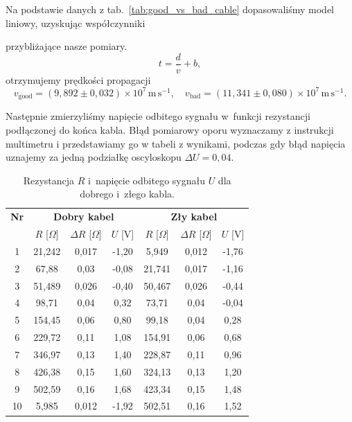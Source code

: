 \documentclass[12pt]{article}
\begin{document}
Na podstawie danych z tab.~\ref{tab:good_vs_bad_cable} dopasowaliśmy model liniowy, uzyskując współczynniki

przybliżające nasze pomiary. 
\[
  t = \frac{d}{v} + b,
\]
otrzymujemy prędkości propagacji
\[
  v_{\mathrm{good}}=(9{,}892\pm0{,}032)\times10^{7}\,\mathrm{m\,s^{-1}},\quad
  v_{\mathrm{bad}}=(11{,}341\pm0{,}080)\times10^{7}\,\mathrm{m\,s^{-1}}.
\]

Następnie zmierzyliśmy napięcie odbitego sygnału w~funkcji rezystancji podłączonej do końca kabla.
Błąd pomiarowy oporu wyznaczamy z instrukcji multimetru\cite{resistance} i przedstawiamy go w tabeli z wynikami, podczas gdy błąd napięcia uznajemy za jedną podziałkę oscyloskopu $\Delta U = 0{,}04$.

\begin{table}[H]
  \centering
    \begin{tabular}{c|ccc|ccc}
        \toprule
        \textbf{Nr} &
        \multicolumn{3}{c|}{\textbf{Dobry kabel}} &
        \multicolumn{3}{c}{\textbf{Zły kabel}} \\
        & $R$ [$\Omega$] & $\Delta R$ [$\Omega$] & $U$ [V] & $R$ [$\Omega$] & $\Delta R$ [$\Omega$] & $U$ [V] \\
        \midrule
        1  & 21{,}242  & 0{,}017 & -1{,}20 & 5{,}949   & 0{,}012 & -1{,}76 \\
        2  & 67{,}88  & 0{,}03 & -0{,}08 & 21{,}741  & 0{,}017 & -1{,}16 \\
        3  & 51{,}489  & 0{,}026 & -0{,}40 & 50{,}467  & 0{,}026 & -0{,}44 \\
        4  & 98{,}71  & 0{,}04 &  0{,}32 & 73{,}71  & 0{,}04 & -0{,}04 \\
        5  & 154{,}45 & 0{,}06 &  0{,}80 & 99{,}18  & 0{,}04 &  0{,}28 \\
        6  & 229{,}72 & 0{,}11 &  1{,}08 & 154{,}91 & 0{,}06 &  0{,}68 \\
        7  & 346{,}97 & 0{,}13 &  1{,}40 & 228{,}87 & 0{,}11 &  0{,}96 \\
        8  & 426{,}38 & 0{,}15 &  1{,}60 & 324{,}13 & 0{,}13 &  1{,}20 \\
        9  & 502{,}59 & 0{,}16 &  1{,}68 & 423{,}34 & 0{,}15 &  1{,}48 \\
        10 & 5{,}985   & 0{,}012 & -1{,}92 & 502{,}51 & 0{,}16 &  1{,}52 \\
        \bottomrule
    \end{tabular}
  \caption{Rezystancja $R$ i~napięcie odbitego sygnału $U$ dla dobrego i~złego kabla.}
  \label{tab:good_vs_bad_cable_voltage}
\end{table}
\end{document}

